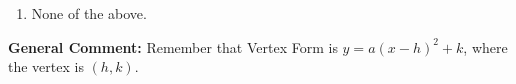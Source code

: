 \documentclass{extbook}[14pt]
\begin{document}
\begin{enumerate}
{\begin{enumerate}[label=\Alph*.]
\item None of the above.\end{enumerate}
\textbf{General Comment:} Remember that Vertex Form is $y = a(x-h)^2+k$, where the vertex is $(h, k)$.
}
\end{enumerate}
\end{document}
